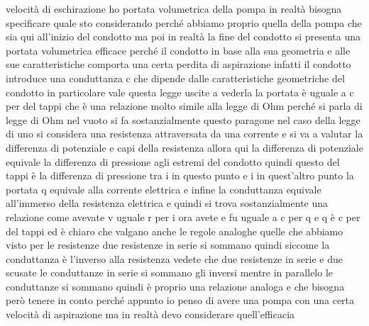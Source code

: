 velocità di eschirazione ho portata volumetrica della pompa in realtà bisogna specificare quale sto considerando perché abbiamo proprio quella della pompa che sia qui all'inizio del condotto ma poi in realtà la fine del condotto si presenta una portata volumetrica efficace perché il condotto in base alla sua geometria e alle sue caratteristiche comporta una certa perdita di aspirazione infatti il condotto introduce una conduttanza c che dipende dalle caratteristiche geometriche del condotto in particolare vale questa legge uscite a vederla la portata è uguale a c per del tappi che è una relazione molto simile alla legge di Ohm perché si parla di legge di Ohm nel vuoto si fa sostanzialmente questo paragone nel caso della legge di uno si considera una resistenza attraversata da una corrente e si va a valutar la differenza di potenziale e capi della resistenza allora qui la differenza di potenziale equivale la differenza di pressione agli estremi del condotto quindi questo del tappi è la differenza di pressione tra i in questo punto e i in quest'altro punto la portata q equivale alla corrente elettrica e infine la conduttanza equivale all'immerso della resistenza elettrica e quindi si trova sostanzialmente una relazione come avevate v uguale r per i ora avete e fu uguale a c per q e q è c per del tappi ed è chiaro che valgano anche le regole analoghe quelle che abbiamo visto per le resistenze due resistenze in serie si sommano quindi siccome la conduttanza è l'inverso alla resistenza vedete che due resistenze in serie e due scusate le conduttanze in serie si sommano gli inversi mentre in parallelo le conduttanze si sommano quindi è proprio una relazione analoga e che bisogna però tenere in conto perché appunto io penso di avere una pompa con una certa velocità di aspirazione ma in realtà devo considerare quell'efficacia

